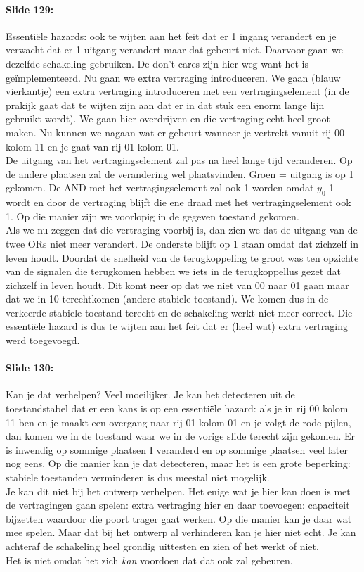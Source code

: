 \documentclass[10pt,a4paper]{book}
\begin{document}
\paragraph{Slide 129:} Essenti\"ele hazards: ook te wijten aan het feit dat er 1 ingang verandert en je verwacht dat er 1 uitgang verandert maar dat gebeurt niet. Daarvoor gaan we dezelfde schakeling gebruiken. De don't cares zijn hier weg want het is ge\"implementeerd. Nu gaan we extra vertraging introduceren. We gaan (blauw vierkantje) een extra vertraging introduceren met een vertragingselement (in de prakijk gaat dat te wijten zijn aan dat er in dat stuk een enorm lange lijn gebruikt wordt). We gaan hier overdrijven en die vertraging echt heel groot maken. Nu kunnen we nagaan wat er gebeurt wanneer je vertrekt vanuit rij 00 kolom 11 en je gaat van rij 01 kolom 01.\\
De uitgang van het vertragingselement zal pas na heel lange tijd veranderen. Op de andere plaatsen zal de verandering wel plaatsvinden. Groen = uitgang is op 1 gekomen. De AND met het vertragingselement zal ook 1 worden omdat $y_0$ 1 wordt en door de vertraging blijft die ene draad met het vertragingselement ook 1. Op die manier zijn we voorlopig in de gegeven toestand gekomen.\\
Als we nu zeggen dat die vertraging voorbij is, dan zien we dat de uitgang van de twee ORs niet meer verandert. De onderste blijft op 1 staan omdat dat zichzelf in leven houdt. Doordat de snelheid van de terugkoppeling te groot was ten opzichte van de signalen die terugkomen hebben we iets in de terugkoppellus gezet dat zichzelf in leven houdt. Dit komt neer op dat we niet van 00 naar 01 gaan maar dat we in 10 terechtkomen (andere stabiele toestand). We komen dus in de verkeerde stabiele toestand terecht en de schakeling werkt niet meer correct. Die essenti\"ele hazard is dus te wijten aan het feit dat er (heel wat) extra vertraging werd toegevoegd. 

\paragraph{Slide 130:} Kan je dat verhelpen? Veel moeilijker. Je kan het detecteren uit de toestandstabel dat er een kans is op een essenti\"ele hazard: als je in rij 00 kolom 11 ben en je maakt een overgang naar rij 01 kolom 01 en je volgt de rode pijlen, dan komen we in de toestand waar we in de vorige slide terecht zijn gekomen. Er is inwendig op sommige plaatsen I veranderd en op sommige plaatsen veel later nog eens. Op die manier kan je dat detecteren, maar het is een grote beperking: stabiele toestanden verminderen is dus meestal niet mogelijk.\\
Je kan dit niet bij het ontwerp verhelpen. Het enige wat je hier kan doen is met de vertragingen gaan spelen: extra vertraging hier en daar toevoegen: capaciteit bijzetten waardoor die poort trager gaat werken. Op die manier kan je daar wat mee spelen. Maar dat bij het ontwerp al verhinderen kan je hier niet echt. Je kan achteraf de schakeling heel grondig uittesten en zien of het werkt of niet.\\
Het is niet omdat het zich \emph{kan} voordoen dat dat ook zal gebeuren. 
\end{document}

